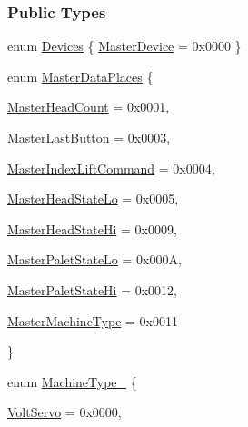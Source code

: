 \subsubsection*{Public Types}
\begin{DoxyCompactItemize}
\item 
enum \mbox{\hyperlink{classMachineSettings_ace5f0a84d32c0423bb62f068f102bf80}{Devices}} \{ \mbox{\hyperlink{classMachineSettings_ace5f0a84d32c0423bb62f068f102bf80aa0ef1af1f748dd75f12dd479a07ff628}{Master\+Device}} = 0x0000
 \}
\item 
enum \mbox{\hyperlink{classMachineSettings_a81ac5b64df7f302bae854ee794f9fbef}{Master\+Data\+Places}} \{ 
\begin{DoxyCompactItemize}
\item\mbox{\hyperlink{classMachineSettings_a81ac5b64df7f302bae854ee794f9fbefa5b952989bf58820434feab7ec0f0e84f}{Master\+Head\+Count}} = 0x0001, 
\item\mbox{\hyperlink{classMachineSettings_a81ac5b64df7f302bae854ee794f9fbefa60c8ac4e12ef5ac9ecd807711ca296c3}{Master\+Last\+Button}} = 0x0003, 
\item\mbox{\hyperlink{classMachineSettings_a81ac5b64df7f302bae854ee794f9fbefad8ee6c0fdfad3e9effda8056da5e68a8}{Master\+Index\+Lift\+Command}} = 0x0004, 
\item\mbox{\hyperlink{classMachineSettings_a81ac5b64df7f302bae854ee794f9fbefa03ad3d79f6edfe1a2477748d6a66386e}{Master\+Head\+State\+Lo}} = 0x0005, 
\item\mbox{\hyperlink{classMachineSettings_a81ac5b64df7f302bae854ee794f9fbefa76129cc9720d12f63764b4089d638589}{Master\+Head\+State\+Hi}} = 0x0009, 
\item\mbox{\hyperlink{classMachineSettings_a81ac5b64df7f302bae854ee794f9fbefabc28c130aa7c10b12f97486f6d443b66}{Master\+Palet\+State\+Lo}} = 0x000A, 
\item\mbox{\hyperlink{classMachineSettings_a81ac5b64df7f302bae854ee794f9fbefaf61a688c14b1370c4630e7bacac34771}{Master\+Palet\+State\+Hi}} = 0x0012, 
\item\mbox{\hyperlink{classMachineSettings_a81ac5b64df7f302bae854ee794f9fbefaf1538a4ff7b63f627657f5fc722a6d25}{Master\+Machine\+Type}} = 0x0011
\end{DoxyCompactItemize}
 \}
\item 
enum \mbox{\hyperlink{classMachineSettings_a0feee7a1964811bb4a602e9cc3bf459f}{Machine\+Type\+\_\+}} \{ 
\begin{DoxyCompactItemize}
\item\mbox{\hyperlink{classMachineSettings_a0feee7a1964811bb4a602e9cc3bf459fa90d1454dea114dab1be411c61eb2506f}{Volt\+Servo}} = 0x0000, 

\end{DoxyCompactItemize}
\end{DoxyCompactItemize}

